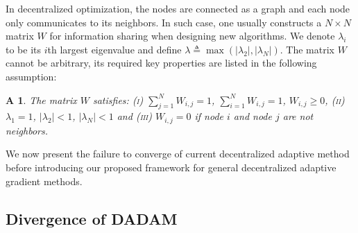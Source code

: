 \documentclass{article} %
\newtheorem{assumptionA}{A\!\!}
\begin{document}
In decentralized optimization, the nodes are connected as a graph and each node only communicates to its neighbors. 
In such case, one usually constructs a $N \times N$ matrix $W$ for information sharing when designing new algorithms. 
We denote $\lambda_i$ to be its $i$th largest eigenvalue and define $\lambda \triangleq \max (|\lambda_2|,|\lambda_N|)$.
The matrix $W$ cannot be arbitrary, its required key properties are listed in the following assumption:
\begin{assumptionA}\label{a:matrixW}
The matrix $W$ satisfies: \textsc{(i)} $\sum_{j=1}^N W_{i,j} = 1$,  $\sum_{i=1}^N W_{i,j} = 1$, $W_{i,j} \geq 0$, \textsc{(ii)} $\lambda_1 = 1$, $|\lambda_2| < 1$, $|\lambda_N| < 1 $ and \textsc{(iii)} $W_{i,j} = 0 $ if node $i$ and node $j$ are not neighbors.
\end{assumptionA}
 We now present the failure to converge of current decentralized adaptive method before introducing our proposed framework for general decentralized adaptive gradient methods.

\vspace{-0.05in}
\subsection{Divergence of DADAM}\label{sec:divergence}
\vspace{-0.05in}
\end{document}
